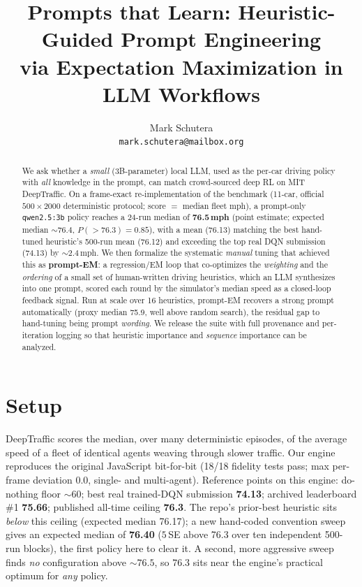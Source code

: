 \documentclass[10pt]{article}
\title{\vspace{-3.5em}\textbf{Prompts that Learn: Heuristic-Guided Prompt
Engineering\\ via Expectation Maximization in LLM Workflows}}
\author{Mark Schutera\\\texttt{mark.schutera@mailbox.org}}
\date{}
\begin{document}
\maketitle\vspace{-2.2em}

\begin{abstract}
\noindent
We ask whether a \emph{small} (3B-parameter) local LLM, used as the per-car
driving policy with \emph{all} knowledge in the prompt, can match crowd-sourced
deep RL on MIT DeepTraffic. On a frame-exact re-implementation of the benchmark
(11-car, official $500\!\times\!2000$ deterministic protocol; score $=$ median
fleet mph), a prompt-only \texttt{qwen2.5:3b} policy reaches a 24-run median of
\textbf{76.5\,mph} (point estimate; expected median ${\sim}76.4$, $P({>}76.3)
{=}0.85$), with a mean (76.13) matching the best hand-tuned heuristic's 500-run
mean (76.12) and exceeding the top real DQN submission (74.13) by ${\sim}2.4$\,mph.
We then formalize the systematic \emph{manual} tuning that achieved this as
\textbf{prompt-EM}: a regression/EM loop that co-optimizes the \emph{weighting}
and the \emph{ordering} of a small set of human-written driving heuristics, which
an LLM synthesizes into one prompt, scored each round by the simulator's median
speed as a closed-loop feedback signal. Run at scale over 16 heuristics, prompt-EM recovers a strong
prompt automatically (proxy median 75.9, well above random search), the residual
gap to hand-tuning being prompt \emph{wording}. We release the suite with full
provenance and per-iteration logging so that heuristic importance and
\emph{sequence} importance can be analyzed.
\end{abstract}
\vspace{-0.6em}

\section{Setup}
DeepTraffic scores the median, over many deterministic episodes, of the average
speed of a fleet of identical agents weaving through slower traffic. Our engine
reproduces the original JavaScript bit-for-bit (18/18 fidelity tests pass; max
per-frame deviation $0.0$, single- and multi-agent). Reference points on this
engine: do-nothing floor ${\sim}60$; best real trained-DQN submission
\textbf{74.13}; archived leaderboard \#1 \textbf{75.66}; published all-time
ceiling \textbf{76.3}. The repo's prior-best heuristic sits \emph{below} this
ceiling (expected median 76.17); a new hand-coded convention sweep gives an
expected median of \textbf{76.40} ($5$\,SE above 76.3 over ten independent
500-run blocks), the first policy here to clear it. A second, more aggressive
sweep finds \emph{no} configuration above ${\sim}76.5$, so $76.3$ sits near the
engine's practical optimum for \emph{any} policy.
\end{document}
